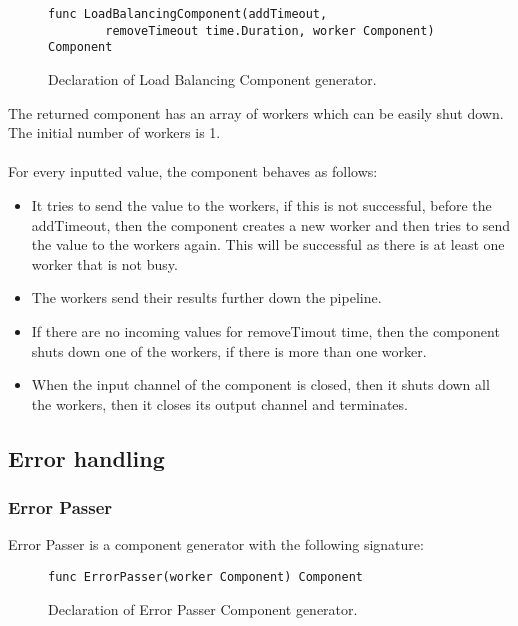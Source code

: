 \documentclass[12pt,a4paper]{article}
\begin{document}
\begin{figure}[h]
\centering
\begin{lstlisting}
func LoadBalancingComponent(addTimeout, 
		removeTimeout time.Duration, worker Component) Component
\end{lstlisting}
\caption[scale=1.0]{Declaration of Load Balancing Component generator.}
\label{fig:loadComp}
\end{figure}

The returned component has an array of workers which can be easily shut down.
The initial number of workers is 1. 
\\
\\
For every inputted value, the component behaves as follows:
\begin{itemize}
	\item It tries to send the value to the workers, if this is not successful, 
				before the addTimeout, then the component creates a new worker and then
				tries to send the value to the workers again. This will be successful as
				there is at least one worker that is not busy.
	\item The workers send their results further down the pipeline.
	\item If there are no incoming values for removeTimout time, then the component
				shuts down one of the workers, if there is more than one worker.
	\item When the input channel of the component is closed, then it shuts down all
				the workers, then it closes its output channel and terminates.

\end{itemize}

\subsection{Error handling}
\subsubsection{Error Passer}
Error Passer is a component generator with the following signature:

\begin{figure}[h]
\centering
\begin{lstlisting}
func ErrorPasser(worker Component) Component
\end{lstlisting}
\caption[scale=1.0]{Declaration of Error Passer Component generator.}
\label{fig:ErrorPasser}
\end{figure}
\end{document}
